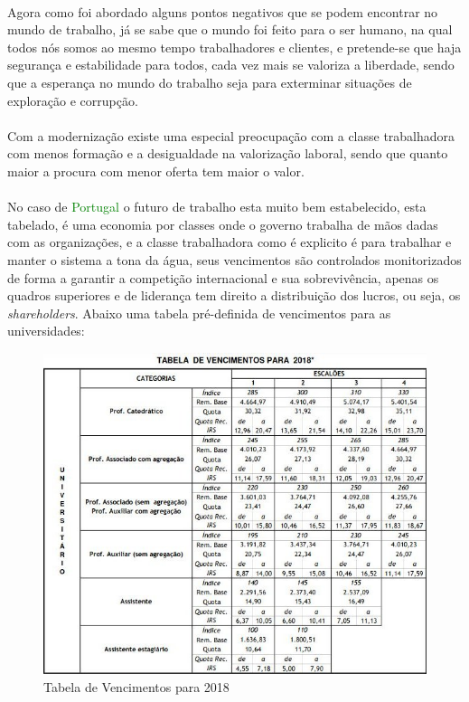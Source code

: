 \\
Agora como foi abordado alguns pontos negativos que se podem encontrar no mundo de trabalho, já se sabe que o mundo foi feito para o ser humano, na qual todos nós somos ao mesmo tempo trabalhadores e clientes, e pretende-se que haja segurança e estabilidade para todos, cada vez mais se valoriza a liberdade, sendo que a esperança no mundo do trabalho seja para exterminar situações de exploração e corrupção.\\
\\
Com a modernização existe uma especial preocupação com a classe trabalhadora com menos formação e a desigualdade na valorização laboral, sendo que quanto maior a procura com menor oferta tem maior o valor.\\
\\
No caso de \textcolor{green}{Portugal} o futuro de trabalho esta muito bem estabelecido, esta tabelado, é uma economia por classes onde o governo trabalha de mãos dadas com as organizações, e a classe trabalhadora como é explicito é para trabalhar e manter o sistema a tona da água, seus vencimentos são controlados monitorizados de forma a garantir a competição internacional e sua sobrevivência, apenas os quadros superiores e de liderança tem direito a distribuição dos lucros, ou seja, os \textit{shareholders}.
\newpage
Abaixo uma tabela pré-definida de vencimentos para as universidades:\\
\begin{figure}[H]
	\centering
	\includegraphics[scale=0.52]{./image/Salary/Universidade.jpg}
	\caption{Tabela de Vencimentos para 2018 \cite{article_2}}
\end{figure}
